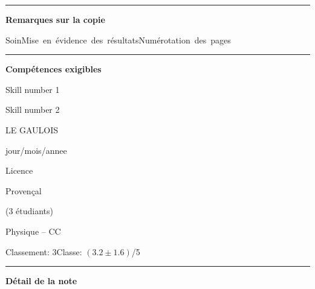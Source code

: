 \documentclass[12pt, a4paper]{article}
\begin{document}
\noindent\rule{\linewidth}{.7pt}\begin{center}{\large\bf Remarques sur la copie}\end{center}

\begin{center}
\noindent \mbox{Soin\xspace\xspace\color{DarkGreen}\faSmileO\color{black}}\hfill \mbox{Mise en évidence des résultats\xspace\xspace\color{DarkGreen}\faSmileO\color{black}}\hfill \mbox{Numérotation des pages\xspace\xspace\color{DarkGreen}\faSmileO\color{black}}\hfill 
\end{center}


\noindent\rule{\linewidth}{.7pt}\begin{center}{\large\bf Compétences exigibles}\end{center}

\begin{minipage}[c]{0.4\linewidth}\centering
Skill number 1\xspace\xspace\color{DarkGreen}\faSmileO\color{black}
\end{minipage}\hfill
\begin{minipage}[c]{0.4\linewidth}\centering
Skill number 2\xspace\xspace\color{DarkRed}\faFrownO\color{black}
\end{minipage}
\newpage
\pagestyle{empty}
\noindent\begin{minipage}[c]{0.31\linewidth}\noindent LE GAULOIS\end{minipage}\hfill
\begin{minipage}[c]{0.31\linewidth}\centering jour/mois/annee \end{minipage}\hfill
\begin{minipage}[c]{0.31\linewidth}\hfill Licence \end{minipage}\hfill

\noindent\begin{minipage}[c]{0.31\linewidth}\noindent Provençal\end{minipage}\hfill
\begin{minipage}[c]{0.31\linewidth}\hfill(3 étudiants)\end{minipage}
\begin{center} Physique -- CC\bigskip

{\Large\bf {}}\end{center}

\vspace*{-0.7cm}\noindent Classement: 3\hfill Classe:  $\left(3.2 \pm 1.6\right)$/5
\noindent\rule{\linewidth}{.7pt}\begin{center}{\large\bf Détail de la note}\end{center}
\end{document}
